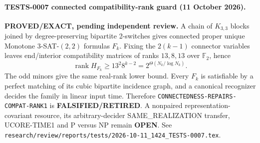 \paragraph{TESTS-0007 connected compatibility-rank guard (11 October 2026).}
\textbf{PROVED/EXACT, pending independent review.}
A chain of $K_{3,3}$ blocks joined by degree-preserving bipartite 2-switches
gives connected proper unique Monotone $3$-SAT-$(2,2)$ formulas $F_k$.
Fixing the $2(k-1)$ connector variables leaves end/interior compatibility
matrices of ranks $13,8,13$ over $\mathbb F_2$, hence
\[
 \operatorname{rank}H_{F_k}\ge 13^2 8^{k-2}
 =2^{\Theta(N_k/\log N_k)}.
\]
The odd minors give the same real-rank lower bound.  Every $F_k$ is
satisfiable by a perfect matching of its cubic bipartite incidence graph,
and a canonical recognizer decides the family in linear input time.
Therefore \texttt{CONNECTEDNESS-REPAIRS-COMPAT-RANK1} is
\textbf{FALSIFIED/RETIRED}.  A nonpaired representation-covariant resource,
its arbitrary-decider SAME\_REALIZATION transfer, UCORE-TIME1 and P versus NP
remain \textbf{OPEN}.  See
\texttt{research/review/reports/tests/2026-10-11\_1424\_TESTS-0007.tex}.
